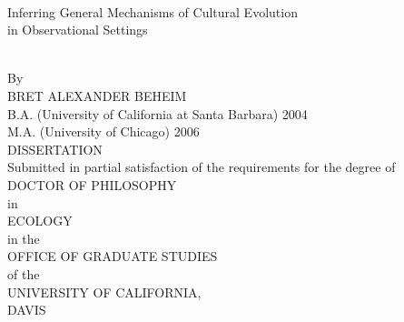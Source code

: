 \documentclass[letterpaper, 12pt, oneside]{book}
\begin{document}
\pagestyle{plain}


\singlespacing

~\vspace{-0.75in} %
\begin{center}
  \begin{Large}
    Inferring General Mechanisms of Cultural Evolution \\ in Observational Settings
  \end{Large}\\
  \vspace{\baselineskip}
  By\\
  \vspace{\baselineskip}
  BRET ALEXANDER BEHEIM\\
  B.A. (University of California at Santa Barbara) 2004 \\ M.A. (University of Chicago) 2006 \\
  \vspace{\baselineskip}
  DISSERTATION\\
  \vspace{\baselineskip}
  Submitted in partial satisfaction of the requirements for the degree of\\
  \vspace{\baselineskip}
  DOCTOR OF PHILOSOPHY\\
  \vspace{\baselineskip}
  in\\
  \vspace{\baselineskip}
  ECOLOGY\\
  \vspace{\baselineskip}
  in the\\
  \vspace{\baselineskip}
  OFFICE OF GRADUATE STUDIES\\
  \vspace{\baselineskip}
  of the\\
  \vspace{\baselineskip}
  UNIVERSITY OF CALIFORNIA,\\
  \vspace{\baselineskip}
  DAVIS\\
  \vspace{\baselineskip}

\end{center}
\end{document}
